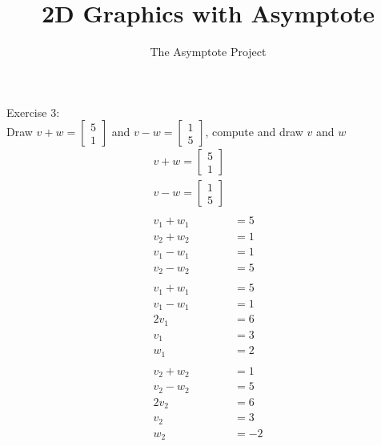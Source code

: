 \documentclass[12pt]{article}
\title{2D Graphics with Asymptote}
\author{The Asymptote Project}
\newcommand{\insertrep}[1]{%
	\hspace*{-2.4cm}
	\fbox{\texttt{[image: \#1]}}
}
\begin{document}
Exercise 3:\\
Draw $v+w=\begin{bmatrix}5\\1\end{bmatrix}$ and $v-w=\begin{bmatrix}1\\5\end{bmatrix}$, compute and draw $v$ and $w$\\
\begin{align*}
	v+w=\begin{bmatrix}5\\1\end{bmatrix}\\
	v-w=\begin{bmatrix}1\\5\end{bmatrix}\\
	\\
	v_1+w_1&=5\\
	v_2+w_2&=1\\
	v_1-w_1&=1\\
	v_2-w_2&=5\\
	\\
	v_1+w_1&=5\\
	v_1-w_1&=1\\
	2v_1&=6\\
	v_1&=3\\
	w_1&=2\\
	\\
	v_2+w_2&=1\\
	v_2-w_2&=5\\
	2v_2&=6\\
	v_2&=3\\
	w_2&=-2
\end{align*}
\begin{center}
	\insertrep{exercise01003.pdf}
\end{center}
\end{document}

